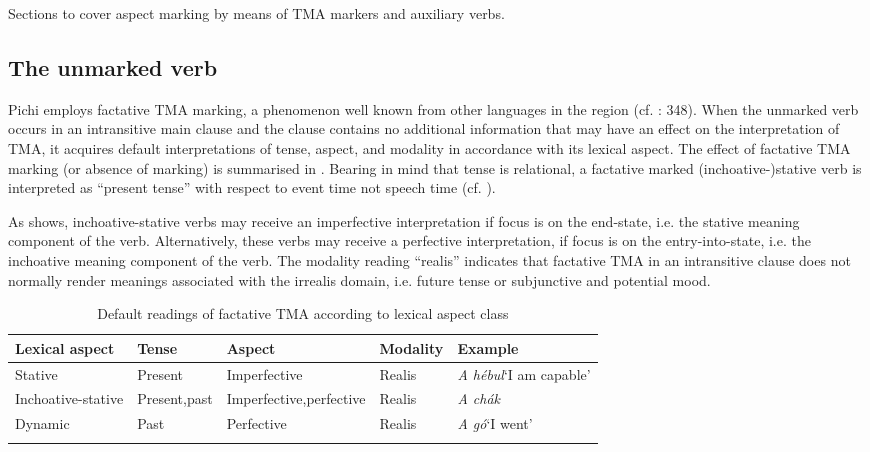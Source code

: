 Sections  to  cover aspect marking by means of TMA markers and auxiliary verbs. 

\subsection{The unmarked verb}\label{sec:6.3.1}

Pichi employs factative TMA marking, a phenomenon well known from other languages in the region (cf. \citealt{Welmers1973}: 348). When the unmarked verb occurs in an intransitive main clause and the clause contains no additional information that may have an effect on the interpretation of TMA, it acquires default interpretations of tense, aspect, and modality in accordance with its lexical aspect. The effect of factative TMA marking (or absence of marking) is summarised in . Bearing in mind that tense is relational, a factative marked (inchoative-)stative verb is interpreted as “present tense” with respect to event time not speech time (cf. ). 


As  shows, inchoative-stative verbs may receive an imperfective interpretation if focus is on the end-state, i.e. the stative meaning component of the verb. Alternatively, these verbs may receive a perfective interpretation, if focus is on the entry-into-state, i.e. the inchoative meaning component of the verb. The modality reading “realis” indicates that factative TMA in an intransitive clause does not normally render meanings associated with the irrealis domain, i.e. future tense or subjunctive and potential mood. 


\begin{table}
\caption{Default readings of factative TMA according to lexical aspect class}
\label{tab:key:6.4}

\begin{tabularx}{\textwidth}{Qp{1.3cm}p{1.9cm}lp{2.3cm}}
\lsptoprule
Lexical aspect & Tense & Aspect & Modality & Example\\
\midrule
Stative & Present & Imperfective & Realis & \textit{A hébul}\newline ‘I am capable’\\
\tablevspace
Inchoative-stative & Present,\newline past & Imperfective,\newline perfective & Realis & \textit{A chák}\\
\tablevspace
Dynamic & Past & Perfective & Realis & \textit{A gó}\newline ‘I went’\\
\lspbottomrule
\end{tabularx}
\end{table}

